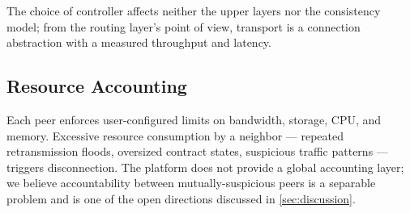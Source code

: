 The choice of controller affects neither the upper layers nor the consistency model; from the routing layer's point of view, transport is a connection abstraction with a measured throughput and latency.

\subsection{Resource Accounting}

Each peer enforces user-configured limits on bandwidth, storage, CPU, and memory. Excessive resource consumption by a neighbor --- repeated retransmission floods, oversized contract states, suspicious traffic patterns --- triggers disconnection. The platform does not provide a global accounting layer; we believe accountability between mutually-suspicious peers is a separable problem and is one of the open directions discussed in \cref{sec:discussion}.
